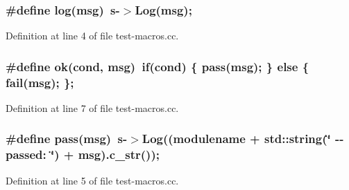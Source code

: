 \hypertarget{test-macros_8cc_a642fd9241bc9e4219ea15503ca87fefb}{
\subsubsection[{log}]{\setlength{\rightskip}{0pt plus 5cm}\#define log(msg)~s-\/$>$Log(msg);}}
\label{test-macros_8cc_a642fd9241bc9e4219ea15503ca87fefb}


Definition at line 4 of file test-\/macros.cc.

\hypertarget{test-macros_8cc_afaeb9641e4b11cff7242820dbb1c156d}{
\subsubsection[{ok}]{\setlength{\rightskip}{0pt plus 5cm}\#define ok(cond, \/  msg)~if(cond) \{ pass(msg); \} else \{ fail(msg); \};}}
\label{test-macros_8cc_afaeb9641e4b11cff7242820dbb1c156d}


Definition at line 7 of file test-\/macros.cc.

\hypertarget{test-macros_8cc_af496d3b8121eb066859c5af577597d9c}{
\subsubsection[{pass}]{\setlength{\rightskip}{0pt plus 5cm}\#define pass(msg)~s-\/$>$Log((modulename + std::string(\char`\"{} -\/-\/ passed: \char`\"{}) + msg).c\_\-str());}}
\label{test-macros_8cc_af496d3b8121eb066859c5af577597d9c}


Definition at line 5 of file test-\/macros.cc.

